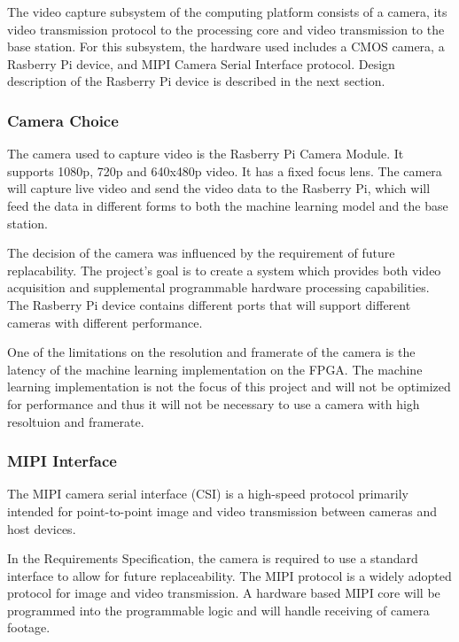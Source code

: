 
The video capture subsystem of the computing platform consists of a camera, its video transmission protocol to the processing core and video transmission to the base station. For this subsystem, the hardware used includes a CMOS camera, a Rasberry Pi device, and MIPI Camera Serial Interface protocol. Design description of the Rasberry Pi device is described in the next section.

\subsubsection{Camera Choice}
The camera used to capture video is the Rasberry Pi Camera Module. It supports 1080p, 720p and 640x480p video. It has a fixed focus lens. The camera will capture live video and send the video data to the Rasberry Pi, which will feed the data in different forms to both the machine learning model and the base station.

The decision of the camera was influenced by the requirement of future replacability. The project's goal is to create a system which provides both video acquisition and supplemental programmable hardware processing capabilities. The Rasberry Pi device contains different ports that will support different cameras with different performance.

One of the limitations on the resolution and framerate of the camera is the latency of the machine learning implementation on the FPGA. The machine learning implementation is not the focus of this project and will not be optimized for performance and thus it will not be necessary to use a camera with high resoltuion and framerate.

\subsubsection{MIPI Interface}
The MIPI camera serial interface (CSI) is a high-speed protocol primarily intended for point-to-point image and video transmission between cameras and host devices. 

In the Requirements Specification, the camera is required to use a standard interface to allow for future replaceability. The MIPI protocol is a widely adopted protocol for image and video transmission. A hardware based MIPI core will be programmed into the programmable logic and will handle receiving of camera footage.

